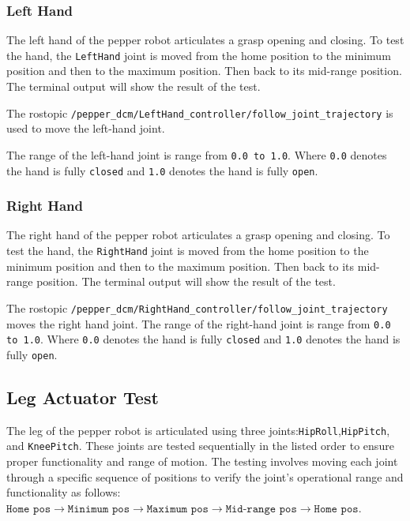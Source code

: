 \documentclass{CSSRforAfrica}
\begin{document}
\subsubsection*{Left Hand}
The left hand of the pepper robot articulates a grasp opening and closing. To test the hand, the \texttt{LeftHand} joint is moved 
from the home position to the minimum position and then to the maximum position. Then back to its mid-range position. The terminal output 
will show the result of the test.

The rostopic \texttt{/pepper\_dcm/LeftHand\_controller/follow\_joint\_trajectory} is
used to move the left-hand joint.

The range of the left-hand joint is range from \texttt{0.0 to 1.0}. Where \texttt{0.0} denotes the hand is fully \texttt{closed} and \texttt{1.0} denotes the hand is fully \texttt{open}.

\subsubsection*{Right Hand}

The right hand of the pepper robot articulates a grasp opening and closing. To test the hand, the \texttt{RightHand} joint is moved
from the home position to the minimum position and then to the maximum position. Then back to its mid-range position. The terminal output
will show the result of the test.

The rostopic \texttt{/pepper\_dcm/RightHand\_controller/follow\_joint\_trajectory} moves the right hand joint. The range of the 
right-hand joint is range from \texttt{0.0 to 1.0}. Where \texttt{0.0} denotes the hand is fully \texttt{closed} and \texttt{1.0} denotes 
the hand is fully \texttt{open}.

\subsection{Leg Actuator Test}

The leg of the pepper robot is articulated using three joints:\texttt{HipRoll},\texttt{HipPitch}, and \texttt{KneePitch}. 
These joints are tested sequentially in the listed order to ensure proper functionality and range of motion. The testing 
involves moving each joint through a specific sequence of positions to verify the joint's operational range and functionality 
as follows:\\
$ \texttt{Home pos} \rightarrow \texttt{Minimum pos} \rightarrow \texttt{Maximum pos} \rightarrow \texttt{Mid-range pos} \rightarrow \texttt{Home pos}$.
\end{document}
